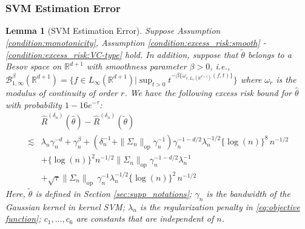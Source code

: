 \documentclass[12pt]{article}
\newtheorem{lemma}{Lemma}%
\newcommand{\R}{\mathbb{R}}
\begin{document}
\subsubsection{SVM Estimation Error}
\begin{lemma}[SVM Estimation Error]\label{lemma:svm_estimation_error}
    Suppose Assumption \ref{condition:monotonicity}, Assumption \ref{condition:excess_risk:smooth} - \ref{condition:excess_risk:VC-type} hold. In addition, suppose that $\tilde\theta$ belongs to a Besov space on $\R^{d+1}$ with smoothness parameter $\beta>0$, i.e., $\mathcal{B}_{1,\infty}^\beta(\R^{d+1}) = \{f\in L_\infty(\R^{d+1})|\sup_{t>0}t^{-\beta\{\omega_{r,L_1(\R^{d+1})}(f,t)\}}\}$ where $\omega_r$ is the modulus of continuity of order $r$. We have the following excess risk bound for $\widehat\theta$ with probability $1-16e^{-\tau}$:
   \begin{align*}
   &\widehat R^{({\delta_n})}(\widehat\theta) - \widehat R^{({\delta_n})}(\tilde\theta)\\
   \lesssim & \lambda_n\gamma_n^{-d} + \gamma_n^{\beta} + \left(\delta_n^{-1}+\|\Sigma_n\|_{\mathrm{op}}\gamma_n^{-1}\right)\gamma_n^{-1-d/2}\lambda_n^{-1/2}\{\log(n)\}^{8}\,n^{-1/2}\\
& + \{\log(n)\}^2 n^{-1/2}\|\Sigma_n\|_{\mathrm{op}}\gamma_n^{-1-d/2}\lambda_n^{-1}\\
& + \sqrt{\tau} \|\Sigma_n\|_{\mathrm{op}}\,\gamma_n^{-1}\lambda_n^{-1/2}\{\log(n)\}^2\,n^{-1/2}
\end{align*}
Here, $\tilde\theta$ is defined in Section \ref{sec:supp_notations}; $\gamma_n$ is the bandwidth of the Gaussian kernel in kernel SVM; $\lambda_n$ is the regularization penalty in \eqref{eq:objective function}; $c_1,\ldots,c_6$ are constants that are independent of $n$.    
\end{lemma}
\end{document}
